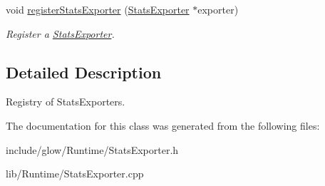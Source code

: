 \begin{DoxyCompactItemize}
\mbox{\label{classglow_1_1_stats_exporter_registry_a58bda3f996d2b5c9d08a0d8062d35997}} 
void \hyperlink{classglow_1_1_stats_exporter_registry_a58bda3f996d2b5c9d08a0d8062d35997}{register\+Stats\+Exporter} (\hyperlink{classglow_1_1_stats_exporter}{Stats\+Exporter} $\ast$exporter)
\begin{DoxyCompactList}\small\item\em Register a \hyperlink{classglow_1_1_stats_exporter}{Stats\+Exporter}. \end{DoxyCompactList}\end{DoxyCompactItemize}


\subsection{Detailed Description}
Registry of Stats\+Exporters. 

The documentation for this class was generated from the following files\+:\begin{DoxyCompactItemize}
\item 
include/glow/\+Runtime/Stats\+Exporter.\+h\item 
lib/\+Runtime/Stats\+Exporter.\+cpp\end{DoxyCompactItemize}
